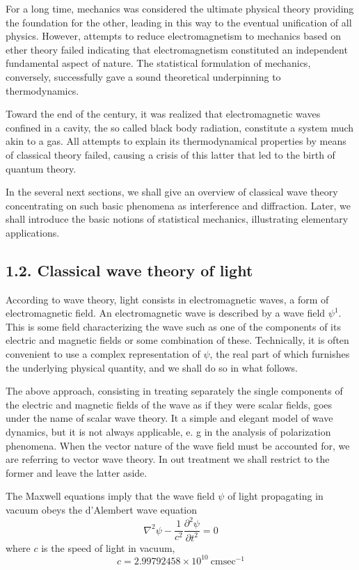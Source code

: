 \documentclass{article}
\begin{document}
For a long time, mechanics was considered the ultimate physical theory providing the foundation for the other, leading in this way to the eventual unification of all physics. However, attempts to reduce electromagnetism to mechanics based on ether theory failed indicating that electromagnetism constituted an independent fundamental aspect of nature. The statistical formulation of mechanics, conversely, successfully gave a sound theoretical underpinning to thermodynamics.

Toward the end of the century, it was realized that electromagnetic waves confined in a cavity, the so called black body radiation, constitute a system much akin to a gas. All attempts to explain its thermodynamical properties by means of classical theory failed, causing a crisis of this latter that led to the birth of quantum theory.

In the several next sections, we shall give an overview of classical wave theory concentrating on such basic phenomena as interference and diffraction. Later, we shall introduce the basic notions of statistical mechanics, illustrating elementary applications.

\subsection*{1.2. Classical wave theory of light}

According to wave theory, light consists in electromagnetic waves, a form of electromagnetic field. An electromagnetic wave is described by a wave field $\psi^{1}$. This is some field characterizing the wave such as one of the components of its electric and magnetic fields or some combination of these. Technically, it is often convenient to use a complex representation of $\psi$, the real part of which furnishes the underlying physical quantity, and we shall do so in what follows.

The above approach, consisting in treating separately the single components of the electric and magnetic fields of the wave as if they were scalar fields, goes under the name of scalar wave theory. It a simple and elegant model of wave dynamics, but it is not always applicable, e. g in the analysis of polarization phenomena. When the vector nature of the wave field must be accounted for, we are referring to vector wave theory. In out treatment we shall restrict to the former and leave the latter aside.

The Maxwell equations imply that the wave field $\psi$ of light propagating in vacuum obeys the d'Alembert wave equation
$$
\begin{equation*}
\nabla^{2} \psi-\frac{1}{c^{2}} \frac{\partial^{2} \psi}{\partial t^{2}}=0 \tag{1.2.1}
\end{equation*}
$$
where $c$ is the speed of light in vacuum,
$$
\begin{equation*}
c=2.99792458 \times 10^{10} \mathrm{~cm} \mathrm{sec}^{-1} \tag{1.2.2}
\end{equation*}
$$
\end{document}
